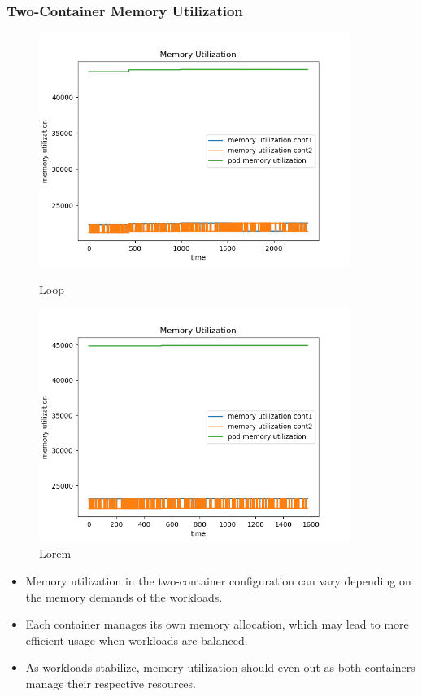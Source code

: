 \subsubsection{Two-Container Memory Utilization}
\begin{figure}[h]
    \begin{minipage}[t]{0.5\textwidth}
        \centering
        \includegraphics[width=0.9\textwidth]{../sample_results/loop/two-container/mem-utilization-two-container.png}
        \caption{Loop}
    \end{minipage}
    \hfill
    \begin{minipage}[t]{0.5\textwidth}
        \centering
        \includegraphics[width=0.9\textwidth]{../sample_results/lorem/two-container/mem-utilization-two-container.png}
        \caption{Lorem}
    \end{minipage}
\end{figure}

\begin{itemize}
    \item Memory utilization in the two-container configuration can vary depending on the memory demands of the workloads.
    \item Each container manages its own memory allocation, which may lead to more efficient usage when workloads are balanced.
    \item As workloads stabilize, memory utilization should even out as both containers manage their respective resources.
\end{itemize}

